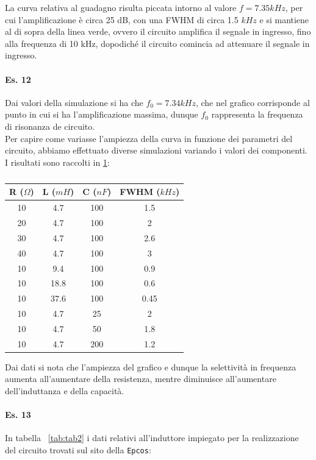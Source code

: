 \documentclass[journal, a4paper]{IEEEtran}
\begin{document}
La curva relativa al guadagno risulta piccata intorno al valore $f=7.35 kHz$, per cui l'amplificazione è circa 25 dB, con una FWHM di circa 1.5 $kHz$ e si mantiene al di sopra della linea verde, ovvero il circuito amplifica il segnale in ingresso, fino alla frequenza di 10 kHz, dopodiché il circuito comincia ad attenuare il segnale in ingresso.

\paragraph{Es. 12}
Dai valori della simulazione si ha che $f_0 = 7.34 kHz$, che nel grafico corrisponde al punto in cui si ha l'amplificazione massima, dunque $f_0$ rappresenta la frequenza di risonanza de circuito.\\
Per capire come variasse l'ampiezza della curva in funzione dei parametri del circuito, abbiamo effettuato diverse simulazioni variando i valori dei componenti. I risultati sono raccolti in
\ref{tab:tab1}:\\

\begin{table}[htp]
\caption{}
\label{tab:tab1}
\begin{tabular}{c|c|c|c}
\hline 
R ($\Omega$) & L ($mH$) & C ($nF$) & FWHM ($kHz$) \\ 
\hline 
10 & 4.7 & 100 & 1.5 \\ 
\hline 
20 & 4.7 & 100 & 2 \\ 
\hline 
30 & 4.7 & 100 & 2.6 \\ 
\hline 
40 & 4.7 & 100 & 3 \\ 
\hline 
10 & 9.4 & 100 & 0.9 \\ 
\hline 
10 & 18.8 & 100 & 0.6 \\ 
\hline 
10 & 37.6 & 100 & 0.45 \\ 
\hline 
10 & 4.7 & 25 & 2 \\ 
\hline 
10 & 4.7 & 50 & 1.8 \\ 
\hline 
10 & 4.7 & 200 & 1.2 \\
\hline
\end{tabular} 
\centering
\end{table}

Dai dati si nota che l'ampiezza del grafico e dunque la selettività in frequenza aumenta all'aumentare della resistenza, mentre diminuisce all'aumentare dell'induttanza e della capacità.

\paragraph{Es. 13}
In tabella ~\ref{tab:tab2} i dati relativi all'induttore impiegato per la realizzazione del circuito trovati sul sito della \texttt{Epcos}:
\end{document}
